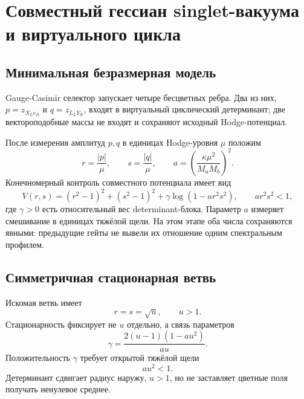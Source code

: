 \chapter{Совместный гессиан singlet-вакуума и виртуального цикла}
\label{ch:v7-singlet-vacuum-virtual-cycle-combined-hessian-gate}

\section{Минимальная безразмерная модель}

Gauge-Casimir селектор запускает четыре бесцветных ребра. Два из них,
$p=z_{X_Le_R}$ и $q=z_{L_LY_R}$, входят в виртуальный циклический
детерминант; две вектороподобные массы не входят и сохраняют исходный
Hodge-потенциал.

После измерения амплитуд $p,q$ в единицах Hodge-уровня $\mu$ положим
\begin{equation}
 r=\frac{|p|}{\mu},\qquad s=\frac{|q|}{\mu},\qquad
 a=\left(\frac{\kappa\mu^2}{M_aM_b}\right)^2.
 \label{eq:v7-combined-hessian-variables}
\end{equation}
Конечномерный контроль совместного потенциала имеет вид
\begin{equation}
 V(r,s)=(r^2-1)^2+(s^2-1)^2
 +\gamma\log(1-ar^2s^2),
 \qquad ar^2s^2<1,
 \label{eq:v7-combined-hessian-potential}
\end{equation}
где $\gamma>0$ есть относительный вес determinant-блока. Параметр $a$
измеряет смешивание в единицах тяжёлой щели. На этом этапе оба числа
сохраняются явными: предыдущие гейты не вывели их отношение одним
спектральным профилем.

\section{Симметричная стационарная ветвь}

Искомая ветвь имеет
\begin{equation}
 r=s=\sqrt u,\qquad u>1.
 \label{eq:v7-combined-hessian-symmetric-branch}
\end{equation}
Стационарность фиксирует не $u$ отдельно, а связь параметров
\begin{equation}
 \gamma=\frac{2(u-1)(1-au^2)}{au}.
 \label{eq:v7-combined-hessian-stationarity}
\end{equation}
Положительность $\gamma$ требует открытой тяжёлой щели
\begin{equation}
 au^2<1.
 \label{eq:v7-combined-hessian-gap}
\end{equation}
Детерминант сдвигает радиус наружу, $u>1$, но не заставляет цветные поля
получать ненулевое среднее.

